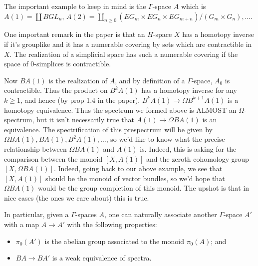 \documentclass[letterpaper]{article}
\theoremstyle{definition}
\begin{document}
The important example to keep in mind is the $\Gamma$-space $A$ which
is $A(1) = \coprod BGL_n$, $A(2) = \coprod_{n \geq 0} (EG_m \times
EG_n \times EG_{m+n})/(G_m \times G_n) , \dots$.

One important remark in the paper is that an $H$-space $X$ has a
homotopy inverse if it's grouplike and it has a numerable covering by
sets which are contractible in $X$. The realization of a simplicial
space has such a numerable covering if the space of $0$-simplices is
contractible. 

Now $BA(1)$ is the realization of $A$, and by definition of a
$\Gamma$-space, $A_0$ is contractible. Thus the product on $B^kA(1)$
has a homotopy inverse for any $k \geq 1$, and hence (by prop 1.4 in
the paper), $B^kA(1) \rightarrow \Omega B^{k+1}A(1)$ is a homotopy
equivalence. Thus the spectrum we formed above is ALMOST an
$\Omega$-spectrum, but it isn't necessarily true that $A(1)\rightarrow
\Omega BA(1)$ is an equivalence. The spectrification of this
prespectrum will be given by $\Omega BA(1), BA(1), B^2A(1),\dots $, so
we'd like to know what the precise relationship between $\Omega BA(1)$
and $A(1)$ is. Indeed, this is asking for the comparison between the
monoid $[X,A(1)]$ and the zeroth cohomology group $[X,\Omega
BA(1)]$. Indeed, going back to our above example, we see that
$[X,A(1)]$ should be the monoid of vector bundles, so we'd hope that
$\Omega BA(1)$ would be the group completion of this monoid. The
upshot is that in nice cases (the ones we care about) this is true. 

In
particular, given a $\Gamma$-spaces $A$, one can naturally associate
another $\Gamma$-space $A'$ with a map $A \rightarrow A'$ with the
following properties:
\begin{itemize}
\item $\pi_0(A')$ is the abelian group associated to the monoid
  $\pi_0(A)$; and
\item $BA \rightarrow BA'$ is a weak equivalence of spectra. 
\end{itemize}
\end{document}
